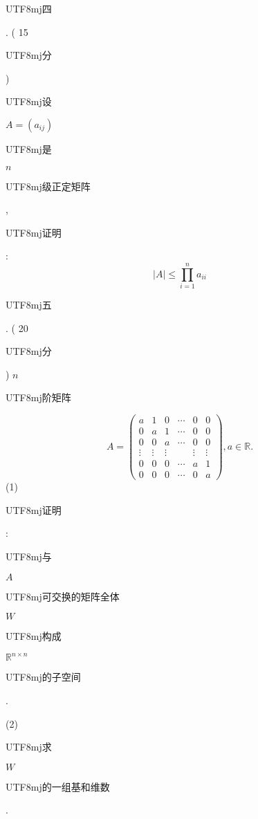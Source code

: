 \documentclass[10pt]{article}
\begin{document}
\begin{CJK}{UTF8}{mj}四\end{CJK}. ( 15 \begin{CJK}{UTF8}{mj}分\end{CJK}) \begin{CJK}{UTF8}{mj}设\end{CJK} $A=\left(a_{i j}\right)$ \begin{CJK}{UTF8}{mj}是\end{CJK} $n$ \begin{CJK}{UTF8}{mj}级正定矩阵\end{CJK}, \begin{CJK}{UTF8}{mj}证明\end{CJK}:
$$
|A| \leqslant \prod_{i=1}^{n} a_{i i}
$$
\begin{CJK}{UTF8}{mj}五\end{CJK}. ( 20 \begin{CJK}{UTF8}{mj}分\end{CJK}) $n$ \begin{CJK}{UTF8}{mj}阶矩阵\end{CJK}
$$
A=\left(\begin{array}{cccccc}
a & 1 & 0 & \cdots & 0 & 0 \\
0 & a & 1 & \cdots & 0 & 0 \\
0 & 0 & a & \cdots & 0 & 0 \\
\vdots & \vdots & \vdots & & \vdots & \vdots \\
0 & 0 & 0 & \cdots & a & 1 \\
0 & 0 & 0 & \cdots & 0 & a
\end{array}\right), a \in \mathbb{R} .
$$
(1) \begin{CJK}{UTF8}{mj}证明\end{CJK}: \begin{CJK}{UTF8}{mj}与\end{CJK} $A$ \begin{CJK}{UTF8}{mj}可交换的矩阵全体\end{CJK} $W$ \begin{CJK}{UTF8}{mj}构成\end{CJK} $\mathbb{R}^{n \times n}$ \begin{CJK}{UTF8}{mj}的子空间\end{CJK}.

(2) \begin{CJK}{UTF8}{mj}求\end{CJK} $W$ \begin{CJK}{UTF8}{mj}的一组基和维数\end{CJK}.
\end{document}

